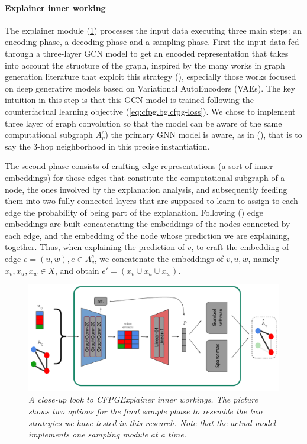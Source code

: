 \documentclass[binding=0.6cm]{sapthesis}
\newcommand{\mycite}[1]{(\cite{#1})}
\begin{document}
\paragraph{Explainer inner working}
\label{sec:cfpg.my.cfpg-inner}
The explainer module (\cref{fig:cfpg.my.cfpg-inner}) processes the input data executing three main steps: an encoding phase, a decoding phase and a sampling phase. First the input data fed through a three-layer GCN model to get an encoded representation that takes into account the structure of the graph, inspired by the many works in graph generation literature that exploit this strategy \mycite{zhu2022-survey-generation}, especially those works focused on deep generative models based on Variational AutoEncoders (VAEs). The key intuition in this step is that this  GCN model is trained following the counterfactual learning objective (\cref{eq:cfpg.bg.cfpg-loss}). We chose to implement three layer of graph convolution so that the  model can be aware of the same computational subgraph $A^c_v$) the primary GNN model is aware, as in \mycite{ying2019-gnnexplainer}, that is to say the 3-hop neighborhood in this precise instantiation.

The second phase consists of crafting edge representations (a sort of inner embeddings) for those edges that constitute the computational subgraph of a node, the ones involved by the explanation analysis, and subsequently feeding them into two fully connected layers that are supposed to learn to assign to each edge the probability of being part of the explanation. Following \mycite{luo2020-pgexplainer} edge embeddings are built concatenating the embeddings of the nodes connected by each edge, and the embedding of the node whose prediction we are explaining, together. Thus, when explaining the prediction of $v$, to craft the embedding of edge $e = (u,w), e \in A^c_v$, we concatenate the embeddings of $v,u,w$, namely $x_v,x_u,x_w \in X$, and obtain $e' = (x_v \cup x_u \cup x_w)$.

\begin{figure}[h]
    \centering
    \includegraphics[width=\textwidth]{imgs/cfpg/cfpg-inner-pdf.png}
    \caption{\textit{A close-up look to CFPGExplainer inner workings. The picture shows two options for the final sample phase to resemble the two strategies we have tested in this research. Note that the actual model implements one sampling module at a time.}}
    \label{fig:cfpg.my.cfpg-inner}
\end{figure}
\end{document}
